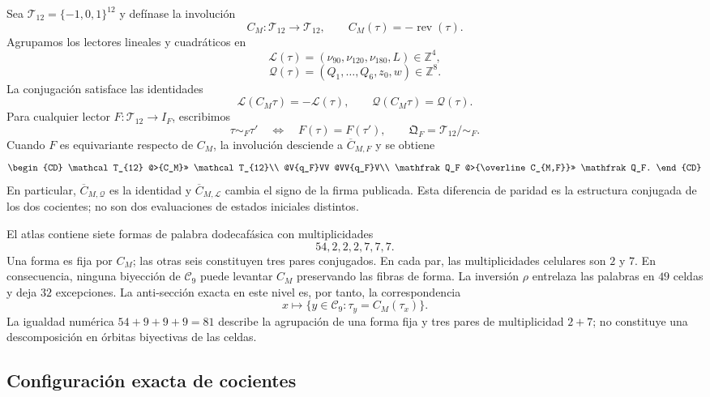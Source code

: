 Sea \(\mathcal T_{12}=\{-1,0,1\}^{12}\) y defínase la involución
\[
 C_M:\mathcal T_{12}\longrightarrow\mathcal T_{12},
 \qquad C_M(\tau)=-\operatorname{rev}(\tau).
\]
Agrupamos los lectores lineales y cuadráticos en
\[
 \mathcal L(\tau)=
 (\nu_{90},\nu_{120},\nu_{180},L)\in\mathbb Z^4,
\]
\[
 \mathcal Q(\tau)=
 (Q_1,\ldots,Q_6,z_0,w)\in\mathbb Z^8.
\]
La conjugación satisface las identidades
\begin{equation}
 \mathcal L(C_M\tau)=-\mathcal L(\tau),
 \qquad
 \mathcal Q(C_M\tau)=\mathcal Q(\tau).
 \label{eq:paridad-conjugacion-rev11}
\end{equation}
Para cualquier lector \(F:\mathcal T_{12}\to I_F\), escribimos
\[
 \tau\sim_F\tau'\quad\Longleftrightarrow\quad F(\tau)=F(\tau'),
 \qquad
 \mathfrak Q_F=\mathcal T_{12}/\!\sim_F.
\]
Cuando \(F\) es equivariante respecto de \(C_M\), la involución desciende a
\(\overline C_{M,F}\) y se obtiene
\[
\begin{CD}
 \mathcal T_{12} @>{C_M}>> \mathcal T_{12}\\
 @V{q_F}VV @VV{q_F}V\\
 \mathfrak Q_F @>{\overline C_{M,F}}>> \mathfrak Q_F.
\end{CD}
\]
En particular, \(\overline C_{M,\mathcal Q}\) es la identidad y
\(\overline C_{M,\mathcal L}\) cambia el signo de la firma publicada. Esta
diferencia de paridad es la estructura conjugada de los dos cocientes; no
son dos evaluaciones de estados iniciales distintos.

El atlas contiene siete formas de palabra dodecafásica con multiplicidades
\begin{equation}
 54,2,2,2,7,7,7.
 \label{eq:multiplicidades-formas-rev11}
\end{equation}
Una forma es fija por \(C_M\); las otras seis constituyen tres pares
conjugados. En cada par, las multiplicidades celulares son \(2\) y \(7\).
En consecuencia, ninguna biyección de \(\mathcal C_9\) puede levantar
\(C_M\) preservando las fibras de forma. La inversión \(\rho\) entrelaza las
palabras en \(49\) celdas y deja \(32\) excepciones. La anti-sección exacta
en este nivel es, por tanto, la correspondencia
\[
 x\longmapsto
 \{y\in\mathcal C_9:\tau_y=C_M(\tau_x)\}.
\]
La igualdad numérica \(54+9+9+9=81\) describe la agrupación de una forma
fija y tres pares de multiplicidad \(2+7\); no constituye una
descomposición en órbitas biyectivas de las celdas.

\subsection{Configuración exacta de cocientes}


